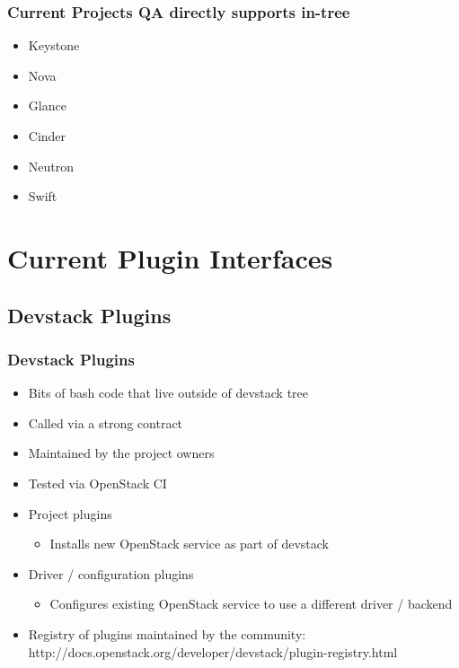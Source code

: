 \documentclass[aspectratio=169,11pt,hyperref={colorlinks=true}]{beamer}
\begin{document}
\begin{frame}
    \frametitle{Current Projects QA directly supports in-tree}
    \begin{itemize}
        \item Keystone
        \item Nova
        \item Glance
        \item Cinder
        \item Neutron
        \item Swift
    \end{itemize}
\end{frame}

\section{Current Plugin Interfaces}
\subsection{Devstack Plugins}
\begin{frame}
	\frametitle{Devstack Plugins}
    \begin{itemize}
    \item{Bits of bash code that live outside of devstack tree}
    \item{Called via a strong contract}
    \item{Maintained by the project owners}
    \item{Tested via OpenStack CI}
    \end{itemize}

    \begin{itemize}
    \item{Project plugins}
    	\begin{itemize}
    		\item Installs new OpenStack service as part of devstack
    	\end{itemize}
    \item{Driver / configuration plugins}
    	\begin{itemize}
    		\item Configures existing OpenStack service to use a different driver / backend
    	\end{itemize}
    \item Registry of plugins maintained by the community: \hfill
    \\ http://docs.openstack.org/developer/devstack/plugin-registry.html
    \end{itemize}
\end{frame}
\end{document}
